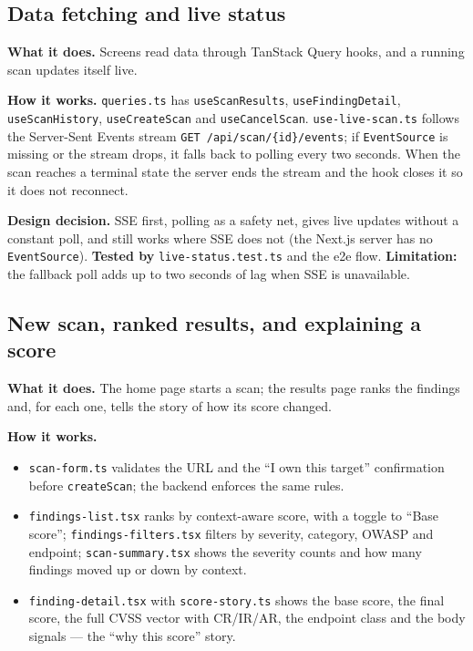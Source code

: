 \subsection{Data fetching and live status}
\textbf{What it does.} Screens read data through TanStack Query hooks, and a
running scan updates itself live.

\textbf{How it works.} \texttt{queries.ts} has \texttt{useScanResults},
\texttt{useFindingDetail}, \texttt{useScanHistory}, \texttt{useCreateScan} and
\texttt{useCancelScan}. \texttt{use-live-scan.ts} follows the Server-Sent Events
stream \texttt{GET /api/scan/\{id\}/events}; if \texttt{EventSource} is missing or
the stream drops, it falls back to polling every two seconds. When the scan
reaches a terminal state the server ends the stream and the hook closes it so it
does not reconnect.

\textbf{Design decision.} SSE first, polling as a safety net, gives live updates
without a constant poll, and still works where SSE does not (the Next.js server
has no \texttt{EventSource}). \textbf{Tested by} \texttt{live-status.test.ts} and
the e2e flow. \textbf{Limitation:} the fallback poll adds up to two seconds of
lag when SSE is unavailable.

\subsection{New scan, ranked results, and explaining a score}
\textbf{What it does.} The home page starts a scan; the results page ranks the
findings and, for each one, tells the story of how its score changed.

\textbf{How it works.}
\begin{itemize}
\item \texttt{scan-form.ts} validates the URL and the ``I own this target''
confirmation before \texttt{createScan}; the backend enforces the same rules.
\item \texttt{findings-list.tsx} ranks by context-aware score, with a toggle to
``Base score''; \texttt{findings-filters.tsx} filters by severity, category,
OWASP and endpoint; \texttt{scan-summary.tsx} shows the severity counts and how
many findings moved up or down by context.
\item \texttt{finding-detail.tsx} with \texttt{score-story.ts} shows the base
score, the final score, the full CVSS vector with CR/IR/AR, the endpoint class
and the body signals --- the ``why this score'' story.
\end{itemize}

